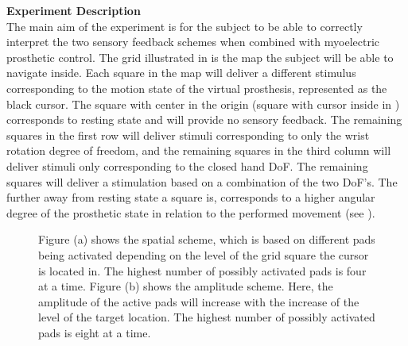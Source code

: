 \noindent\textbf{{\Large Experiment Description}} \\
\newline
The main aim of the experiment is for the subject to be able to correctly interpret the two sensory feedback schemes when combined with myoelectric prosthetic control. The grid illustrated in  is the map the subject will be able to navigate inside. Each square in the map will deliver a different stimulus corresponding to the motion state of the virtual prosthesis, represented as the black cursor. The square with center in the origin (square with cursor inside in ) corresponds to resting state and will provide no sensory feedback. The remaining squares in the first row will deliver stimuli corresponding to only the wrist rotation degree of freedom, and the remaining squares in the third column will deliver stimuli only corresponding to the closed hand DoF. The remaining squares will deliver a stimulation based on a combination of the two DoF's. The further away from resting state a square is, corresponds to a higher angular degree of the prosthetic state in relation to the performed movement (see ). 
\\

\begin{figure} [H]
	\caption{Figure (a) shows the spatial scheme, which is based on different pads being activated depending on the level of the grid square the cursor is located in. The highest number of possibly activated pads is four at a time. Figure (b) shows the amplitude scheme. Here, the amplitude of the active pads will increase with the increase of the level of the target location. The highest number of possibly activated pads is eight at a time.}
	\label{fig:sensconfigs}
\end{figure}


